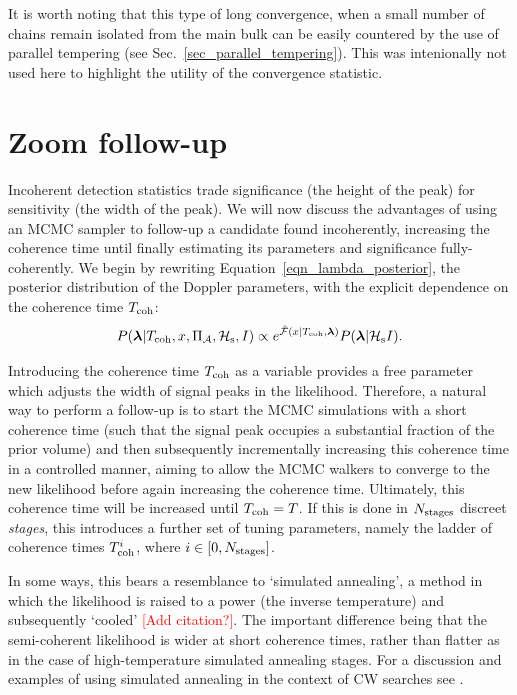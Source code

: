 \documentclass[aps, prd, twocolumn, superscriptaddress, floatfix, showpacs, nofootinbib, longbibliography]{revtex4-1}
\newcommand{\comment}[1]{\textcolor{red}{[#1]}}
\begin{document}
It is worth noting that this type of long convergence, when a small number of
chains remain isolated from the main bulk can be easily countered by the use
of parallel tempering (see Sec.~\ref{sec_parallel_tempering}). This was intenionally
not used here to highlight the utility of the convergence statistic.


\section{Zoom follow-up}
\label{sec_follow_up}

Incoherent detection statistics trade significance (the height of the peak) for
sensitivity (the width of the peak). We will now discuss the advantages of
using an MCMC sampler to follow-up a candidate found incoherently, increasing
the coherence time until finally estimating its parameters and significance
fully-coherently. We begin by rewriting Equation~\eqref{eqn_lambda_posterior},
the posterior distribution of the Doppler parameters, with the explicit
dependence on the coherence time $T_{\rm coh}$:
\begin{equation}
P(\boldsymbol{\mathbf{\lambda}} | T_{\rm coh}, x, \Pi_\mathcal{A}, \mathcal{H}_{\rm s}, I)
\propto e^{\hat{{\mathcal{F}}}(x| T_{\rm coh}, \boldsymbol{\mathbf{\lambda}})} P(\boldsymbol{\mathbf{\lambda}}| \mathcal{H}_{\rm s} I).
\end{equation}

Introducing the coherence time $T_{\rm coh}$ as a variable provides a free parameter
which adjusts the width of signal peaks in the likelihood. Therefore, a natural way
to perform a follow-up is to start the MCMC simulations with a short coherence
time (such that the signal peak occupies a substantial fraction of the prior
volume) and then subsequently incrementally increasing this coherence time in a
controlled manner, aiming to allow the MCMC walkers to converge to the new
likelihood before again increasing the coherence time. Ultimately, this
coherence time will be increased until $T_{\rm coh} = T$. If this is done in
$N_{\rm stages}$ discreet \emph{stages}, this introduces a further set of tuning
parameters, namely the ladder of coherence times $T_{\rm coh}^{i}$, where $i \in [0,
N_{\rm stages}]$.

In some ways, this bears a resemblance to `simulated annealing', a method in
which the likelihood is raised to a power (the inverse temperature) and
subsequently `cooled' \comment{Add citation?}. The important difference being
that the semi-coherent likelihood is wider at short coherence times, rather
than flatter as in the case of high-temperature simulated annealing stages. For
a discussion and examples of using simulated annealing in the context of CW
searches see \citet{veitch2007}.
\end{document}
